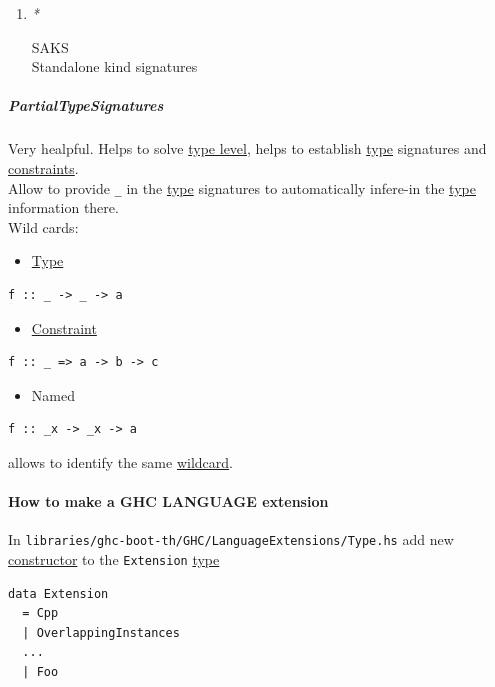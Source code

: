 \documentclass[11pt]{article}
\begin{document}
\begin{enumerate}
\item \emph{*}
\label{sec:orgcd46d08}

\label{orgc9294d2}SAKS\\
\label{orgdd92004}Standalone kind signatures\\
\end{enumerate}

\subparagraph{\label{org25bc79c}PartialTypeSignatures}
\label{sec:orgae6ba70}
Very healpful. Helps to solve \hyperref[org01e5da3]{type level}, helps to establish \hyperref[org4fbaeb8]{type} signatures and \hyperref[org76311a9]{constraints}.\\
Allow to provide \texttt{\_} in the \hyperref[org4fbaeb8]{type} signatures to automatically infere-in the \hyperref[org4fbaeb8]{type} information there.\\

Wild cards:\\
\begin{itemize}
\item \hyperref[org4fbaeb8]{Type}\\
\end{itemize}
\begin{verbatim}
f :: _ -> _ -> a
\end{verbatim}

\begin{itemize}
\item \hyperref[org7bec652]{Constraint}\\
\end{itemize}
\begin{verbatim}
f :: _ => a -> b -> c
\end{verbatim}

\begin{itemize}
\item Named\\
\end{itemize}
\begin{verbatim}
f :: _x -> _x -> a
\end{verbatim}
allows to identify the same \hyperref[orgc7ff37d]{wildcard}.\\

\paragraph{How to make a GHC LANGUAGE extension}
\label{sec:org1b46aa8}

In \texttt{libraries/ghc-boot-th/GHC/LanguageExtensions/Type.hs} add new \hyperref[orgd019743]{constructor} to the \texttt{Extension} \hyperref[org4fbaeb8]{type}\\
\begin{verbatim}
data Extension
  = Cpp
  | OverlappingInstances
  ...
  | Foo
\end{verbatim}
\end{document}
